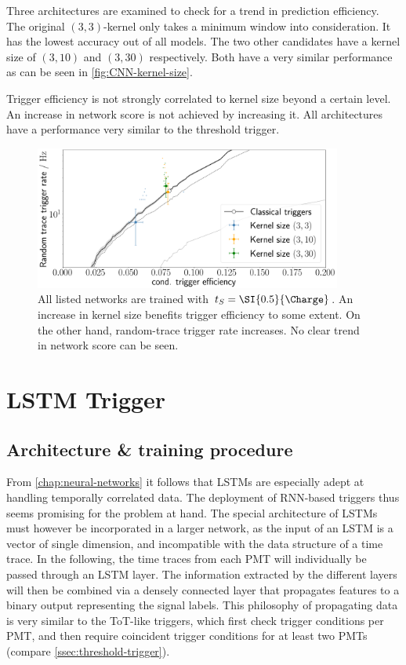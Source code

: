 Three architectures are examined to check for a trend in prediction efficiency. The original $(3, 3)$-kernel only takes a minimum window into consideration. 
It has the lowest accuracy out of all models. The two other candidates have a kernel size of $(3, 10)$ and $(3, 30)$ respectively. Both have a very similar 
performance as can be seen in \autoref{fig:CNN-kernel-size}. 

Trigger efficiency is not strongly correlated to kernel size beyond a certain level. An increase in network score is not achieved by increasing it. All 
architectures have a performance very similar to the threshold trigger.

\begin{figure}
	\centering
	\includegraphics[width=0.9\textwidth]{./plots/CNN_kernel_size.png}
	\caption{All listed networks are trained with $t_S = \SI{0.5}{\Charge}$. An increase in kernel size benefits trigger efficiency to some extent. On the other
	hand, random-trace trigger rate increases. No clear trend in network score can be seen.}
	\label{fig:CNN-kernel-size}
\end{figure}

\section{LSTM Trigger}
\label{sec:lstm-performance}

\subsection{Architecture \& training procedure}
\label{ssec:lstm-architecture}

From \autoref{chap:neural-networks} it follows that LSTMs are especially adept at handling temporally correlated data. The deployment of RNN-based triggers thus 
seems promising for the problem at hand. The special architecture of LSTMs must however be incorporated in a larger network, as the input of an LSTM is a 
vector of single dimension, and incompatible with the data structure of a time trace. In the following, the time traces from each PMT will individually be passed
through an LSTM layer. The information extracted by the different layers will then be combined via a densely connected layer that propagates features to a binary
output representing the signal labels. This philosophy of propagating data is very similar to the ToT-like triggers, which first check trigger conditions per PMT,
and then require coincident trigger conditions for at least two PMTs (compare \autoref{ssec:threshold-trigger}).

